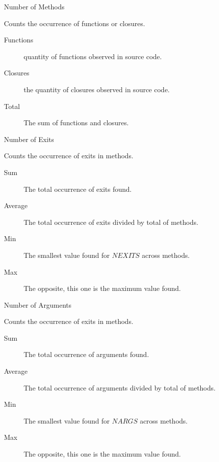 \begin{itemize}
  \item Number of Methods \begin{description}
          \item Counts the occurrence of functions or closures. \begin{description}
                  \item[Functions] quantity of functions observed in source code.
                  \item[Closures] the quantity of closures observed in source code.
                  \item[Total] The sum of functions and closures.
                \end{description}
        \end{description}

  \item Number of Exits \begin{description}
          \item Counts the occurrence of exits in methods. \begin{description}
                  \item[Sum] The total occurrence of exits found.
                  \item[Average] The total occurrence of exits divided by total of methods.
                  \item[Min] The smallest value found for $NEXITS$ across methods.
                  \item[Max] The opposite, this one is the maximum value found.
                \end{description}
        \end{description}

  \item Number of Arguments \begin{description}
          \item Counts the occurrence of exits in methods. \begin{description}
                  \item[Sum] The total occurrence of arguments found.
                  \item[Average] The total occurrence of arguments divided by total of methods.
                  \item[Min] The smallest value found for $NARGS$ across methods.
                  \item[Max] The opposite, this one is the maximum value found.
                \end{description}
        \end{description}
\end{itemize}

